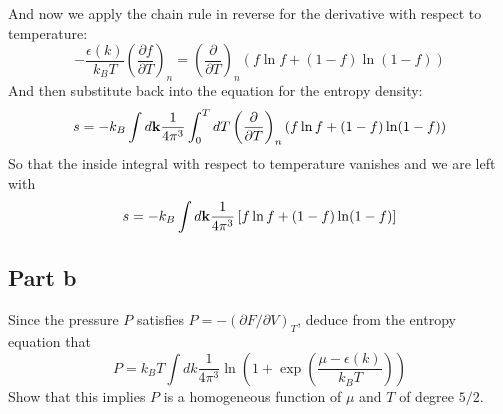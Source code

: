 \documentclass[12pt]{article}
\begin{document}
And now we apply the chain rule in reverse for the derivative with respect to temperature:
\begin{equation}
    -\frac{\epsilon (k)}{k_B T} \left( \frac{\partial f}{\partial T} \right)_n = \left( \frac{\partial}{\partial T} \right)_n \left( f \ln f + (1 - f) \ln (1 - f) \right)
\end{equation}
And then substitute back into the equation for the entropy density:
\begin{equation}
    s = -k_B \int d\vb{k} \frac{1}{4\pi^3} \int_{0}^{T} dT \left( \frac{\partial}{\partial T} \right)_n \left( f \ln f + (1 - f) \ln (1 - f) \right)
\end{equation}
So that the inside integral with respect to temperature vanishes and we are left with
\begin{equation}
    s = -k_B \int d\vb{k} \frac{1}{4\pi^3} \left[ f \ln f + (1 - f) \ln (1 - f) \right]
\end{equation}

\subsection{Part b}
Since the pressure \( P \) satisfies \( P = -\left( \partial F / \partial V \right)_T \), deduce from the entropy equation that
\[
P = k_B T \int dk \frac{1}{4\pi^3} \ln \left( 1 + \exp \left( \frac{\mu - \epsilon(k)}{k_B T} \right) \right)
\]
Show that this implies \( P \) is a homogeneous function of \( \mu \) and \( T \) of degree \( 5/2 \).
\end{document}

